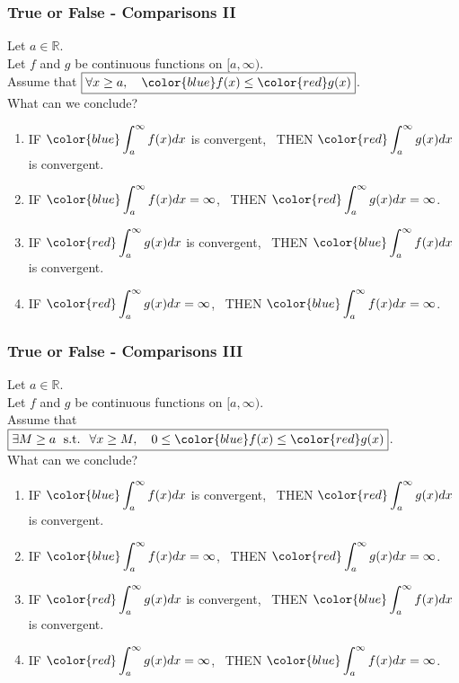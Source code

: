 \begin{frame}[t]
	\fontsize{11}{11}\selectfont
	\frametitle{True or False - Comparisons II}

	Let $a \in \mathbb{R}$. \\ Let $f$ and $g$ be continuous functions on
	$[a, \infty)$. \\ Assume that $\displaystyle \boxed{\forall x \geq a, \quad {\color{blue} f(x)} \leq {\color{red} g(x)}}$.
	\\ What can we conclude?

	\begin{enumerate}
		\item IF $\displaystyle{\color{blue} \int_a^{\infty} f(x) dx}$ is convergent,
			\, THEN $\displaystyle{\color{red} \int_a^{\infty} g(x) dx}$ is convergent.

		\item IF $\displaystyle{\color{blue} \int_a^{\infty} f(x) dx}= \infty$, \,
			THEN $\displaystyle{\color{red} \int_a^{\infty} g(x) dx}= \infty$.

		\item IF $\displaystyle{\color{red} \int_a^{\infty} g(x) dx}$ is convergent,
			\, THEN $\displaystyle{\color{blue} \int_a^{\infty} f(x) dx}$ is
			convergent.

		\item IF $\displaystyle{\color{red} \int_a^{\infty} g(x) dx}= \infty$, \,
			THEN $\displaystyle{\color{blue} \int_a^{\infty} f(x) dx}= \infty$.
	\end{enumerate}
\end{frame}

\begin{frame}[t]
	\fontsize{11}{11}\selectfont
	\frametitle{True or False - Comparisons III}

	Let $a \in \mathbb{R}$. \\ Let $f$ and $g$ be continuous functions on
	$[a, \infty)$. \\ Assume that $\displaystyle \boxed{\exists M \geq a \; \text{ s.t. } \; \forall x \geq M, \quad 0 \leq {\color{blue} f(x)} \leq {\color{red} g(x)}}$.
	\\ What can we conclude?

	\begin{enumerate}
		\item IF $\displaystyle{\color{blue} \int_a^{\infty} f(x) dx}$ is convergent,
			\, THEN $\displaystyle{\color{red} \int_a^{\infty} g(x) dx}$ is convergent.

		\item IF $\displaystyle{\color{blue} \int_a^{\infty} f(x) dx}= \infty$, \,
			THEN $\displaystyle{\color{red} \int_a^{\infty} g(x) dx}= \infty$.

		\item IF $\displaystyle{\color{red} \int_a^{\infty} g(x) dx}$ is convergent,
			\, THEN $\displaystyle{\color{blue} \int_a^{\infty} f(x) dx}$ is
			convergent.

		\item IF $\displaystyle{\color{red} \int_a^{\infty} g(x) dx}= \infty$, \,
			THEN $\displaystyle{\color{blue} \int_a^{\infty} f(x) dx}= \infty$.
	\end{enumerate}
\end{frame}

